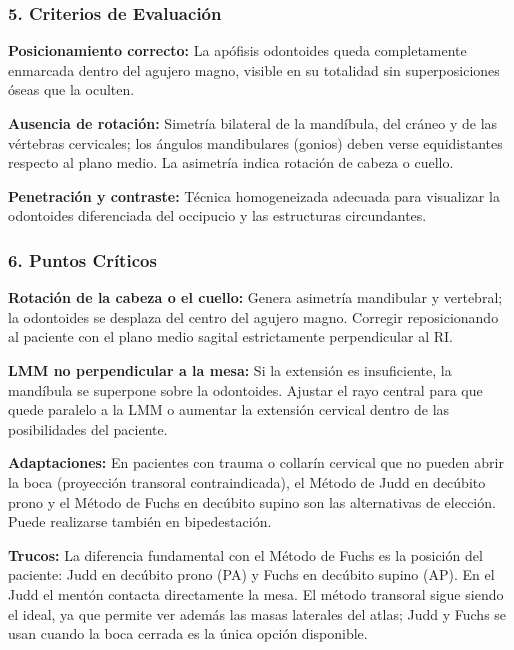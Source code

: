 		\subsubsection*{5. Criterios de Evaluación}
		
		\textbf{Posicionamiento correcto:} La apófisis odontoides queda completamente enmarcada dentro del agujero magno, visible en su totalidad sin superposiciones óseas que la oculten.
		
		\textbf{Ausencia de rotación:} Simetría bilateral de la mandíbula, del cráneo y de las vértebras cervicales; los ángulos mandibulares (gonios) deben verse equidistantes respecto al plano medio. La asimetría indica rotación de cabeza o cuello.
		
		\textbf{Penetración y contraste:} Técnica homogeneizada adecuada para visualizar la odontoides diferenciada del occipucio y las estructuras circundantes.
		
		\subsubsection*{6. Puntos Críticos}
		
		\textbf{Rotación de la cabeza o el cuello:} Genera asimetría mandibular y vertebral; la odontoides se desplaza del centro del agujero magno. Corregir reposicionando al paciente con el plano medio sagital estrictamente perpendicular al RI.
		
		\textbf{LMM no perpendicular a la mesa:} Si la extensión es insuficiente, la mandíbula se superpone sobre la odontoides. Ajustar el rayo central para que quede paralelo a la LMM o aumentar la extensión cervical dentro de las posibilidades del paciente.
		
		\textbf{Adaptaciones:} En pacientes con trauma o collarín cervical que no pueden abrir la boca (proyección transoral contraindicada), el Método de Judd en decúbito prono y el Método de Fuchs en decúbito supino son las alternativas de elección. Puede realizarse también en bipedestación.
		
		\textbf{Trucos:} La diferencia fundamental con el Método de Fuchs es la posición del paciente: Judd en decúbito prono (PA) y Fuchs en decúbito supino (AP). En el Judd el mentón contacta directamente la mesa. El método transoral sigue siendo el ideal, ya que permite ver además las masas laterales del atlas; Judd y Fuchs se usan cuando la boca cerrada es la única opción disponible.
		
		
			\onecolumn
		\clearpage
		
